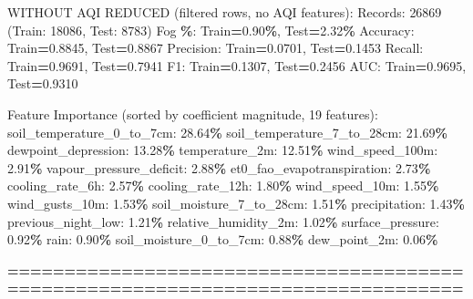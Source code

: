 \documentclass[
  letterpaper,
  DIV=11,
  numbers=noendperiod]{scrartcl}
\newenvironment{Shaded}{\begin{snugshade}}{\end{snugshade}}
\newcommand{\BuiltInTok}[1]{#1}
\newcommand{\DecValTok}[1]{\textcolor[rgb]{0.00,0.00,0.81}{#1}}
\newcommand{\FloatTok}[1]{\textcolor[rgb]{0.00,0.00,0.81}{#1}}
\newcommand{\NormalTok}[1]{#1}
\newcommand{\OperatorTok}[1]{\textcolor[rgb]{0.81,0.36,0.00}{\textbf{#1}}}
\begin{document}
\begin{Shaded}
\begin{Highlighting}[]
\NormalTok{WITHOUT AQI REDUCED (filtered rows, no AQI features):}
\NormalTok{  Records: }\DecValTok{26869}\NormalTok{ (Train: }\DecValTok{18086}\NormalTok{, Test: }\DecValTok{8783}\NormalTok{)}
\NormalTok{  Fog }\OperatorTok{\%}\NormalTok{: Train}\OperatorTok{=}\FloatTok{0.90}\OperatorTok{\%}\NormalTok{, Test}\OperatorTok{=}\FloatTok{2.32}\OperatorTok{\%}
\NormalTok{  Accuracy: Train}\OperatorTok{=}\FloatTok{0.8845}\NormalTok{, Test}\OperatorTok{=}\FloatTok{0.8867}
\NormalTok{  Precision: Train}\OperatorTok{=}\FloatTok{0.0701}\NormalTok{, Test}\OperatorTok{=}\FloatTok{0.1453}
\NormalTok{  Recall: Train}\OperatorTok{=}\FloatTok{0.9691}\NormalTok{, Test}\OperatorTok{=}\FloatTok{0.7941}
\NormalTok{  F1: Train}\OperatorTok{=}\FloatTok{0.1307}\NormalTok{, Test}\OperatorTok{=}\FloatTok{0.2456}
\NormalTok{  AUC: Train}\OperatorTok{=}\FloatTok{0.9695}\NormalTok{, Test}\OperatorTok{=}\FloatTok{0.9310}

\NormalTok{  Feature Importance (}\BuiltInTok{sorted}\NormalTok{ by coefficient magnitude, }\DecValTok{19}\NormalTok{ features):}
\NormalTok{    soil\_temperature\_0\_to\_7cm: }\FloatTok{28.64}\OperatorTok{\%}
\NormalTok{    soil\_temperature\_7\_to\_28cm: }\FloatTok{21.69}\OperatorTok{\%}
\NormalTok{    dewpoint\_depression: }\FloatTok{13.28}\OperatorTok{\%}
\NormalTok{    temperature\_2m: }\FloatTok{12.51}\OperatorTok{\%}
\NormalTok{    wind\_speed\_100m: }\FloatTok{2.91}\OperatorTok{\%}
\NormalTok{    vapour\_pressure\_deficit: }\FloatTok{2.88}\OperatorTok{\%}
\NormalTok{    et0\_fao\_evapotranspiration: }\FloatTok{2.73}\OperatorTok{\%}
\NormalTok{    cooling\_rate\_6h: }\FloatTok{2.57}\OperatorTok{\%}
\NormalTok{    cooling\_rate\_12h: }\FloatTok{1.80}\OperatorTok{\%}
\NormalTok{    wind\_speed\_10m: }\FloatTok{1.55}\OperatorTok{\%}
\NormalTok{    wind\_gusts\_10m: }\FloatTok{1.53}\OperatorTok{\%}
\NormalTok{    soil\_moisture\_7\_to\_28cm: }\FloatTok{1.51}\OperatorTok{\%}
\NormalTok{    precipitation: }\FloatTok{1.43}\OperatorTok{\%}
\NormalTok{    previous\_night\_low: }\FloatTok{1.21}\OperatorTok{\%}
\NormalTok{    relative\_humidity\_2m: }\FloatTok{1.02}\OperatorTok{\%}
\NormalTok{    surface\_pressure: }\FloatTok{0.92}\OperatorTok{\%}
\NormalTok{    rain: }\FloatTok{0.90}\OperatorTok{\%}
\NormalTok{    soil\_moisture\_0\_to\_7cm: }\FloatTok{0.88}\OperatorTok{\%}
\NormalTok{    dew\_point\_2m: }\FloatTok{0.06}\OperatorTok{\%}

\OperatorTok{================================================================================}


\end{Highlighting}
\end{Shaded}
\end{document}
